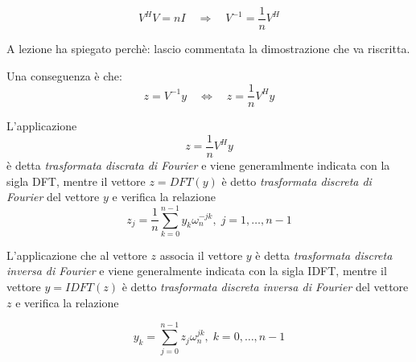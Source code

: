 \begin{theo}
  $$V^{H}V = nI  \quad \Rightarrow \quad V^{-1} = \dfrac{1}{n}V^{H}$$
\end{theo}
\begin{workinprogress}
  A lezione ha spiegato perch\`e: lascio commentata la dimostrazione
 che va riscritta.
\end{workinprogress}
\begin{comment}
  Inffatti
  $(V^HV)_{rs} = \displaystyle \sum_{k=0}^{n-} \overline{\omega_n}^{kr} \omega_n^{ks}
  = \ldots
  $
  Ma
  Vale inoltre vale la propriet\`a
  $$
  \overline{e^{-i\alpha}} = e^{-i\alpha}
  $$
  quindi
  $\overline{\omega_n}^{kr} = (\overline{e^{kr \dfrac{2\pi}{n}i}}) = \omega_{n}^{-kr}$
  Sostituendo
  $$\ldots \displaystyle \sum \omega_n ^{-kr + ks} =
  \sum_{k=0}^{n-1} \omega_n^{k(s-r)}
  $$
  Abbiamo due casi
  \begin{itemize}
  \item $n$ se $s=r$
  \item $0$ se $s \neq r$
  \end{itemize}
\end{comment}

Una conseguenza \`e che:
$$ z = V^{-1} y \quad \Longleftrightarrow \quad
z = \dfrac{1}{n}V^{H} y$$

\begin{defn}
  L'applicazione
  $$z = \dfrac{1}{n}V^{H} y$$
  \`e detta \emph{trasformata discrata di Fourier} e viene
  generamlmente indicata con la sigla DFT, mentre il vettore
  $z= DFT(y)$ \`e detto \emph{trasformata discreta di Fourier}
  del vettore $y$ e verifica la relazione
  \begin{equation}
    \label{fft:02}
    z_j = \dfrac{1}{n} \displaystyle \sum_{k=0}^{n-1}
    y_k \omega_n^{-jk}, \; j=1, \ldots, n-1   
  \end{equation}
\end{defn}

\begin{defn}
  L'applicazione che al vettore $z$ associa il vettore $y$
  \`e detta \emph{trasformata discreta inversa di Fourier}
  e viene generalmente indicata con la sigla IDFT,
  mentre il vettore $y=IDFT(z)$ \`e detto
  \emph{trasformata discreta inversa di Fourier} del vettore
  $z$ e verifica la relazione

\begin{equation}
  \label{fft:03}
  y_k = \displaystyle \sum_{j=0}^{n-1} z_j \omega_n^{jk},
  \;  k =0, \ldots, n-1   
\end{equation}
\end{defn}

